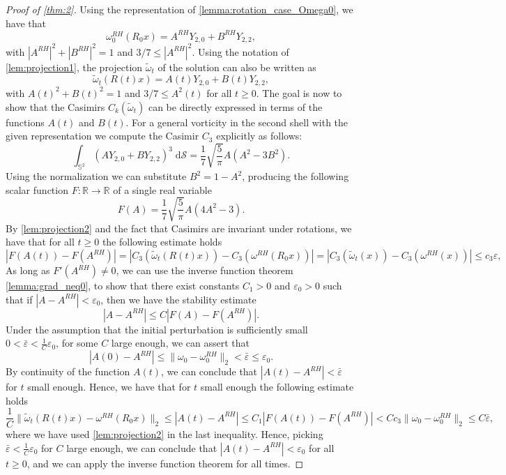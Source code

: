 \documentclass{amsart}
\def\eps{{\varepsilon}}
\begin{document}
\begin{proof}[Proof of \cref{thm:2}]
Using the representation of \cref{lemma:rotation_case_Omega0}, we have that 
$$
\omega_0^{RH}(R_0x) = A^{RH} Y_{2,0} + B^{RH} Y_{2,2},
$$
with $|A^{RH}|^2 + |B^{RH}|^2 = 1$ and $3/7 \leq |A^{RH}|^2$. Using the notation of \cref{lem:projection1}, the projection $\tilde\omega_t$ of the solution can also be written as
\begin{equation*}
    \tilde\omega_t(R(t)x) = A(t) Y_{2,0} + B(t) Y_{2,2},
\end{equation*}
with $A(t)^2 + B(t)^2 = 1$  and $3/7\le A^2(t)$ for all $t \geq 0$. The goal is now to show that the Casimirs $C_k(\tilde\omega_t)$ can be directly expressed in terms of the functions $A(t)$ and $B(t)$. For a general vorticity in the second shell with the given representation we compute the Casimir $C_3$ explicitly as follows:
    \begin{equation}
        \int_{\mathbb{S}^2}(AY_{2,0}+BY_{2,2})^3\;\mathrm{d}\mathcal{S}=\frac{1}{7}\sqrt{\frac{5}{\pi}}A(A^2-3B^2).
        \label{eq:choice_of_k0}
    \end{equation}
Using the normalization we can substitute $B^2=1-A^2$, producing the following scalar function $F:\mathbb{R}\to\mathbb{R}$ of a single real variable
    \begin{equation*}
        F(A)=\frac{1}{7}\sqrt{\frac{5}{\pi}}A(4A^2-3).
    \end{equation*}
By \cref{lem:projection2} and the fact that Casimirs are invariant under rotations, we have that for all $t\geq0$ the following estimate holds
    \begin{equation*}
    |F(A(t))-F(A^{RH})|=|C_3(\tilde\omega_t(R(t)x))-C_3(\omega^{RH}(R_0x))|=|C_3(\tilde\omega_t(x))-C_3(\omega^{RH}(x))|\leq c_3\varepsilon,
    \end{equation*}
As long as $F'(A^{RH})\ne0$, we can use the inverse function theorem \cref{lemma:grad_neq0}, to show that there exist constants $C_1>0$ and $\eps_0>0$ such that if $|A-A^{RH}|<\eps_0$, then we have the stability estimate
$$
    |A-A^{RH}|\leq C|F(A)-F(A^{RH})|.
$$
Under the assumption that the initial perturbation is sufficiently small $0<\bar\eps<\frac{1}{C}\eps_0$, for some $C$ large enough, we can assert that
$$
|A(0)-A^{RH}|\le \|\omega_0-\omega_0^{RH}\|_2<\bar\eps\le \eps_0.
$$
By continuity of the function $A(t)$, we can conclude that $|A(t)-A^{RH}|<\bar\eps$ for $t$ small enough. Hence, we have that for $t$ small enough the following estimate holds
    $$
        \frac{1}{C}\|\tilde\omega_t(R(t)x)-\omega^{RH}(R_0x) \|_2\leq |A(t)-A^{RH}|\leq C_1|F(A(t))-F(A^{RH})|<C c_3 \|\omega_0 - \omega_0^{RH}\|_2\le C \bar\eps,
    $$
    where we have used \cref{lem:projection2} in the last inequality. Hence, picking $\bar\eps<\frac{1}{C}\eps_0$ for $C$ large enough, we can conclude that $|A(t)-A^{RH}|<\eps_0$ for all $t\geq0$, and we can apply the inverse function theorem for all times. 
    

\end{proof}
\end{document}
